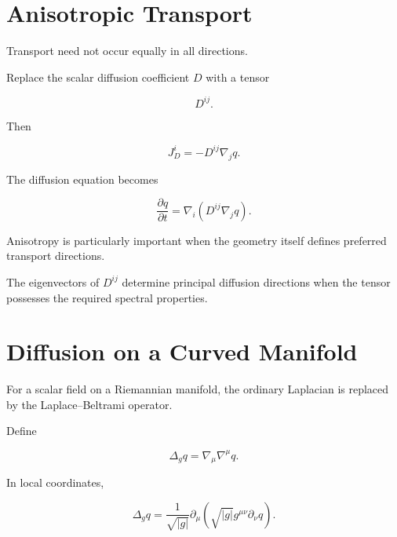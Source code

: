 \documentclass[12pt,oneside]{book}
\begin{document}
\section{Anisotropic Transport}
\label{sec:anisotropic-transport}

Transport need not occur equally in all directions.

Replace the scalar diffusion coefficient \(D\) with a tensor

\begin{equation}
    D^{ij}.
\end{equation}

Then

\begin{equation}
    J_D^i
    =
    -
    D^{ij}
    \nabla_j q.
    \label{eq:anisotropic-flux}
\end{equation}

The diffusion equation becomes

\begin{equation}
    \frac{\partial q}{\partial t}
    =
    \nabla_i
    \left(
        D^{ij}
        \nabla_j q
    \right).
    \label{eq:anisotropic-diffusion}
\end{equation}

Anisotropy is particularly important when the geometry itself
defines preferred transport directions.

The eigenvectors of \(D^{ij}\) determine principal diffusion
directions when the tensor possesses the required spectral
properties.


\section{Diffusion on a Curved Manifold}
\label{sec:diffusion-curved-manifold}

For a scalar field on a Riemannian manifold, the ordinary
Laplacian is replaced by the Laplace--Beltrami operator.

Define

\begin{equation}
    \Delta_g q
    =
    \nabla_\mu\nabla^\mu q.
    \label{eq:laplace-beltrami-definition}
\end{equation}

In local coordinates,

\begin{equation}
    \Delta_g q
    =
    \frac{1}{\sqrt{|g|}}
    \partial_\mu
    \left(
        \sqrt{|g|}
        g^{\mu\nu}
        \partial_\nu q
    \right).
    \label{eq:laplace-beltrami-coordinate}
\end{equation}
\end{document}
